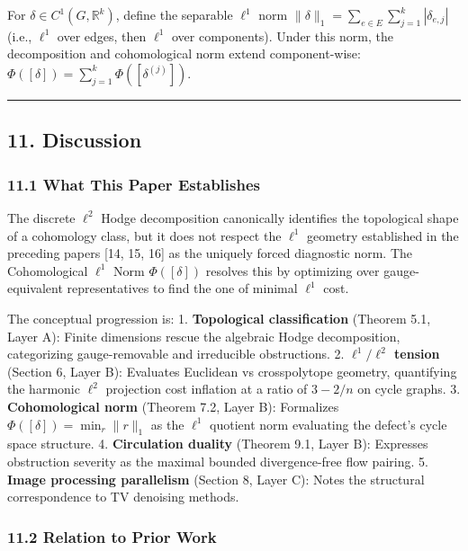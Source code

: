 \documentclass[
]{article}
\begin{document}
For \(\delta \in C^1(G, \mathbb{R}^k)\), define the separable \(\ell^1\)
norm \(\|\delta\|_1 = \sum_{e \in E} \sum_{j=1}^k |\delta_{e,j}|\)
(i.e., \(\ell^1\) over edges, then \(\ell^1\) over components). Under
this norm, the decomposition and cohomological norm extend
component-wise: \(\Phi([\delta]) = \sum_{j=1}^k \Phi([\delta^{(j)}])\).

\begin{center}\rule{0.5\linewidth}{0.5pt}\end{center}

\subsection{11. Discussion}\label{discussion}

\subsubsection{11.1 What This Paper
Establishes}\label{what-this-paper-establishes}

The discrete \(\ell^2\) Hodge decomposition canonically identifies the
topological shape of a cohomology class, but it does not respect the
\(\ell^1\) geometry established in the preceding papers {[}14, 15, 16{]}
as the uniquely forced diagnostic norm. The Cohomological \(\ell^1\)
Norm \(\Phi([\delta])\) resolves this by optimizing over
gauge-equivalent representatives to find the one of minimal \(\ell^1\)
cost.

The conceptual progression is: 1. \textbf{Topological classification}
(Theorem 5.1, Layer A): Finite dimensions rescue the algebraic Hodge
decomposition, categorizing gauge-removable and irreducible
obstructions. 2. \textbf{\(\ell^1/\ell^2\) tension} (Section 6, Layer
B): Evaluates Euclidean vs crosspolytope geometry, quantifying the
harmonic \(\ell^2\) projection cost inflation at a ratio of \(3 - 2/n\)
on cycle graphs. 3. \textbf{Cohomological norm} (Theorem 7.2, Layer B):
Formalizes \(\Phi([\delta]) = \min_r \|r\|_1\) as the \(\ell^1\)
quotient norm evaluating the defect's cycle space structure. 4.
\textbf{Circulation duality} (Theorem 9.1, Layer B): Expresses
obstruction severity as the maximal bounded divergence-free flow
pairing. 5. \textbf{Image processing parallelism} (Section 8, Layer C):
Notes the structural correspondence to TV denoising methods.

\subsubsection{11.2 Relation to Prior
Work}\label{relation-to-prior-work}
\end{document}
